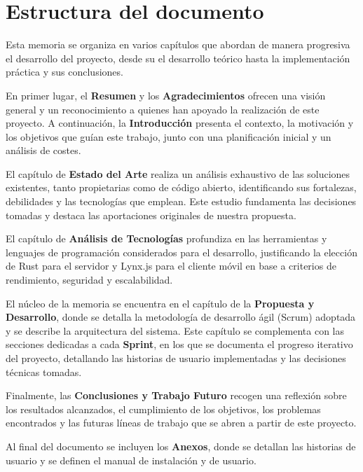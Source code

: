 \section{Estructura del documento}
Esta memoria se organiza en varios capítulos que abordan de manera progresiva el desarrollo del proyecto, desde su el desarrollo teórico hasta la implementación práctica y sus conclusiones.

En primer lugar, el \textbf{Resumen} y los \textbf{Agradecimientos} ofrecen una visión general y un reconocimiento a quienes han apoyado la realización de este proyecto. A continuación, la \textbf{Introducción} presenta el contexto, la motivación y los objetivos que guían este trabajo, junto con una planificación inicial y un análisis de costes.

El capítulo de \textbf{Estado del Arte} realiza un análisis exhaustivo de las soluciones existentes, tanto propietarias como de código abierto, identificando sus fortalezas, debilidades y las tecnologías que emplean. Este estudio fundamenta las decisiones tomadas y destaca las aportaciones originales de nuestra propuesta.

El capítulo de \textbf{Análisis de Tecnologías} profundiza en las herramientas y lenguajes de programación considerados para el desarrollo, justificando la elección de Rust para el servidor y Lynx.js para el cliente móvil en base a criterios de rendimiento, seguridad y escalabilidad.

El núcleo de la memoria se encuentra en el capítulo de la \textbf{Propuesta y Desarrollo}, donde se detalla la metodología de desarrollo ágil (Scrum) adoptada y se describe la arquitectura del sistema. Este capítulo se complementa con las secciones dedicadas a cada \textbf{Sprint}, en los que se documenta el progreso iterativo del proyecto, detallando las historias de usuario implementadas y las decisiones técnicas tomadas.

Finalmente, las \textbf{Conclusiones y Trabajo Futuro} recogen una reflexión sobre los resultados alcanzados, el cumplimiento de los objetivos, los problemas encontrados y las futuras líneas de trabajo que se abren a partir de este proyecto.

Al final del documento se incluyen los \textbf{Anexos}, donde se detallan las historias de usuario y se definen el manual de instalación y de usuario.
